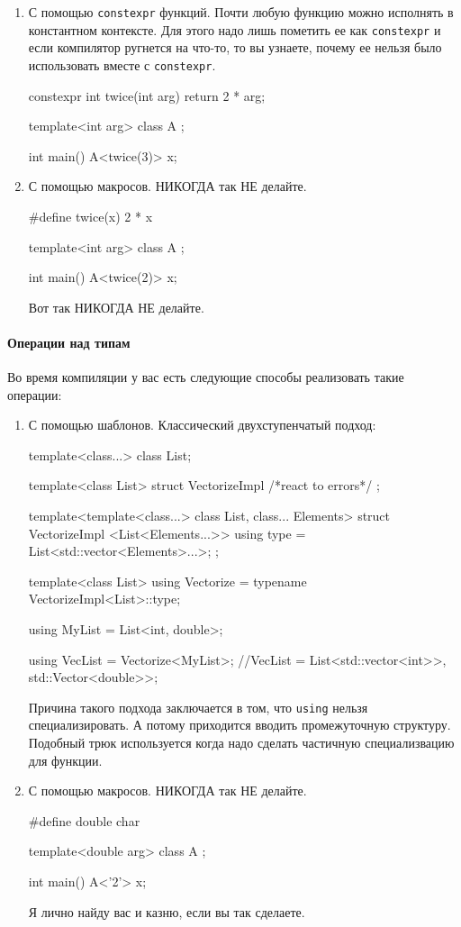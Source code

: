 \begin{enumerate}
\item С помощью \verb"constexpr" функций.
Почти любую функцию можно исполнять в константном контексте.
Для этого надо лишь пометить ее как \verb"constexpr" и если компилятор ругнется на что-то, то вы узнаете, почему ее нельзя было использовать вместе с \verb"constexpr".
\begin{cppcode}
constexpr int twice(int arg) {
  return 2 * arg;
}

template<int arg>
class A {};

int main() {
  A<twice(3)> x;
}
\end{cppcode}

\item С помощью макросов.
НИКОГДА так НЕ делайте.
\begin{cppcode}
#define twice(x) 2 * x

template<int arg>
class A {};

int main() {
  A<twice(2)> x;
}
\end{cppcode}
Вот так НИКОГДА НЕ делайте.
\end{enumerate}

\paragraph{Операции над типам}

Во время компиляции у вас есть следующие способы реализовать такие операции:
\begin{enumerate}
\item С помощью шаблонов.
Классический двухступенчатый подход:
\begin{cppcode}
template<class...>
class List;

template<class List>
struct VectorizeImpl {
  /*react to errors*/
};

template<template<class...> class List, class... Elements>
struct VectorizeImpl <List<Elements...>> {
  using type = List<std::vector<Elements>...>;
};

template<class List>
using Vectorize = typename VectorizeImpl<List>::type;

using MyList = List<int, double>;

using VecList = Vectorize<MyList>;
//VecList = List<std::vector<int>>, std::Vector<double>>;
\end{cppcode}
Причина такого подхода заключается в том, что \verb"using" нельзя специализировать.
А потому приходится вводить промежуточную структуру.
Подобный трюк используется когда надо сделать частичную специализвацию для функции.

\item С помощью макросов.
НИКОГДА так НЕ делайте.
\begin{cppcode}
#define double char

template<double arg>
class A {};

int main() {
  A<'2'> x;
}
\end{cppcode}
Я лично найду вас и казню, если вы так сделаете.
\end{enumerate}

